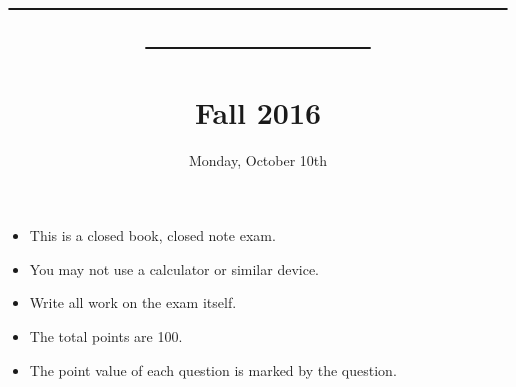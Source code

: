 \documentclass[12pt]{article}
\begin{document}
\title{\underline{~~~~~~~~~~~~~~~~~~~~~~~~~~~~~~~~~~~~~~~~~~~~~}
\\
\vspace{20ex}{\bf CS8440 Midterm Examination}\\{\bf Fall 2016}
}
\date{Monday, October 10th}

\maketitle
\thispagestyle{empty}

{\large
\begin{center}
\begin{minipage}{4.5in}
\begin{itemize}
\item This is a closed book, closed note exam. 
\item You may not use a calculator or similar device.
\item Write all work on the exam itself. 
\item The total points are 100.
\item The point value of each question is marked by the question.
\end{itemize}
\end{minipage}
\end{center}
}                         


\newpage



\end{document}
